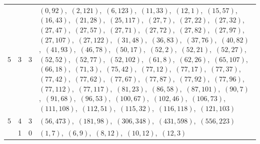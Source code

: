 \documentclass[11pt]{article}
\begin{document}
\begin{longtable}{@{}rrl>{\raggedright\arraybackslash}p{}@{}}
5 & 3 & $3$ & $(0,92)$,\allowbreak\ $(2,121)$,\allowbreak\ $(6,123)$,\allowbreak\ $(11,33)$,\allowbreak\ $(12,1)$,\allowbreak\ $(15,57)$,\allowbreak\ $(16,43)$,\allowbreak\ $(21,28)$,\allowbreak\ $(25,117)$,\allowbreak\ $(27,7)$,\allowbreak\ $(27,22)$,\allowbreak\ $(27,32)$,\allowbreak\ $(27,47)$,\allowbreak\ $(27,57)$,\allowbreak\ $(27,71)$,\allowbreak\ $(27,72)$,\allowbreak\ $(27,82)$,\allowbreak\ $(27,97)$,\allowbreak\ $(27,107)$,\allowbreak\ $(27,122)$,\allowbreak\ $(31,48)$,\allowbreak\ $(36,83)$,\allowbreak\ $(37,76)$,\allowbreak\ $(40,82)$,\allowbreak\ $(41,93)$,\allowbreak\ $(46,78)$,\allowbreak\ $(50,17)$,\allowbreak\ $(52,2)$,\allowbreak\ $(52,21)$,\allowbreak\ $(52,27)$,\allowbreak\ $(52,52)$,\allowbreak\ $(52,77)$,\allowbreak\ $(52,102)$,\allowbreak\ $(61,8)$,\allowbreak\ $(62,26)$,\allowbreak\ $(65,107)$,\allowbreak\ $(66,18)$,\allowbreak\ $(71,3)$,\allowbreak\ $(75,42)$,\allowbreak\ $(77,12)$,\allowbreak\ $(77,17)$,\allowbreak\ $(77,37)$,\allowbreak\ $(77,42)$,\allowbreak\ $(77,62)$,\allowbreak\ $(77,67)$,\allowbreak\ $(77,87)$,\allowbreak\ $(77,92)$,\allowbreak\ $(77,96)$,\allowbreak\ $(77,112)$,\allowbreak\ $(77,117)$,\allowbreak\ $(81,23)$,\allowbreak\ $(86,58)$,\allowbreak\ $(87,101)$,\allowbreak\ $(90,7)$,\allowbreak\ $(91,68)$,\allowbreak\ $(96,53)$,\allowbreak\ $(100,67)$,\allowbreak\ $(102,46)$,\allowbreak\ $(106,73)$,\allowbreak\ $(111,108)$,\allowbreak\ $(112,51)$,\allowbreak\ $(115,32)$,\allowbreak\ $(116,118)$,\allowbreak\ $(121,103)$\\
5 & 4 & $3$ & $(56,473)$,\allowbreak\ $(181,98)$,\allowbreak\ $(306,348)$,\allowbreak\ $(431,598)$,\allowbreak\ $(556,223)$\\
\addlinespace[3pt]
13 & 1 & $0$ & $(1,7)$,\allowbreak\ $(6,9)$,\allowbreak\ $(8,12)$,\allowbreak\ $(10,12)$,\allowbreak\ $(12,3)$\\

\end{longtable}
\end{document}
